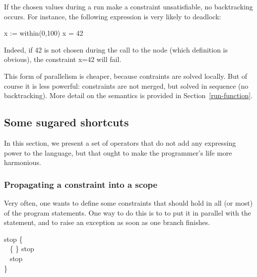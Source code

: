  If the chosen values during a run make a constraint unsatisfiable, no
 backtracking occurs.  For instance, the following expression is very
 likely to deadlock:

\begin{example}
\begin{program}
   x := within(0,100)  x = 42
\end{program}
\end{example}

 Indeed, if 42 is not chosen during the call to the  node
 (which definition is obvious), the constraint x=42 will fail.


This form of parallelism is cheaper, because contraints are solved
locally.  But of course it is less powerful: constraints are not
merged, but solved in sequence (no backtracking).  More detail on the
 semantics is provided in Section~\ref{run-function}.







\subsection{Some sugared shortcuts}

In this  section, we present a set  of operators that do  not add any
expressing power  to the language, but  that ought to  make the \lutin
programmer's life more harmonious.

\subsubsection{Propagating a constraint into a scope}

Very often, one wants to  define some constraints that should hold in
all (or  most) of the  program statements. One  way to do this  is to
to put it in parallel with the statement, and to raise an exception as 
soon as one branch finishes.

\begin{example}
\begin{program}
 stop  \{\\ 
   \ES \  \{   \}   stop\\ 
   \ES \     stop\\
 \} 
\end{program}
\end{example}

